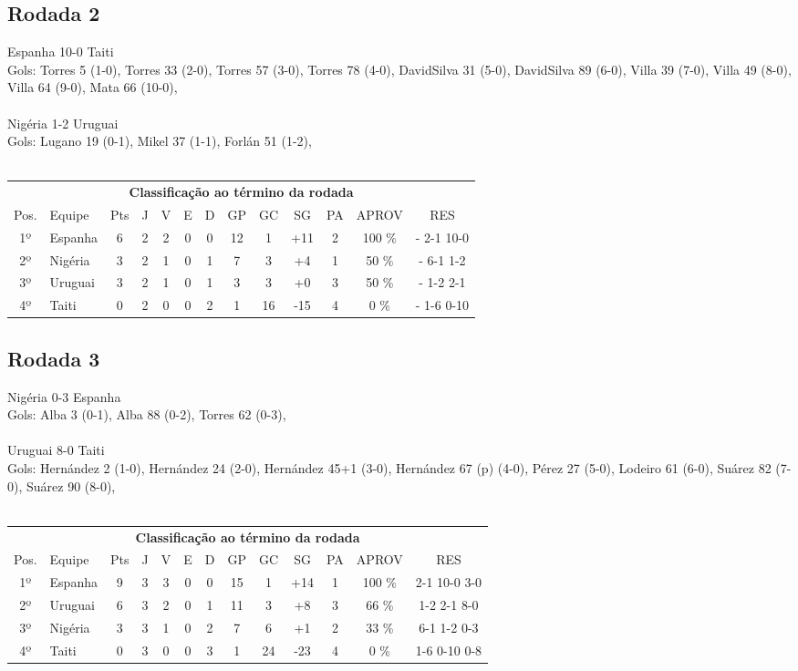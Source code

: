 \documentclass{article}
\begin{document}
\subsection*{Rodada 2}
Espanha 10-0 Taiti\\
Gols: Torres 5 (1-0), Torres 33 (2-0), Torres 57 (3-0), Torres 78 (4-0), DavidSilva 31 (5-0), DavidSilva 89 (6-0), Villa 39 (7-0), Villa 49 (8-0), Villa 64 (9-0), Mata 66 (10-0), \\
\\
Nigéria 1-2 Uruguai\\
Gols: Lugano 19 (0-1), Mikel 37 (1-1), Forlán 51 (1-2), \\
\\
\begin{center}
\begin{tabular}{| c | l | c | c | c | c | c | c | c | c | c | c | c |}
\multicolumn{13}{c}{\textbf{Classificação ao término da rodada}}\\
Pos.&Equipe&Pts&J&V&E&D&GP&GC&SG&PA&APROV&RES\\
1º&Espanha             &6&2	&2&0&0	&12&1&+11	&2&100 \%	& - 2-1 10-0 \\
2º&Nigéria             &3&2	&1&0&1	&7&3&+4	&1& 50 \%	& - 6-1 1-2 \\
3º&Uruguai             &3&2	&1&0&1	&3&3&+0	&3& 50 \%	& - 1-2 2-1 \\
4º&Taiti               &0&2	&0&0&2	&1&16&-15	&4&  0 \%	& - 1-6 0-10 \\
\end{tabular}
\end{center}


\subsection*{Rodada 3}
Nigéria 0-3 Espanha\\
Gols: Alba 3 (0-1), Alba 88 (0-2), Torres 62 (0-3), \\
\\
Uruguai 8-0 Taiti\\
Gols: Hernández 2 (1-0), Hernández 24 (2-0), Hernández 45+1 (3-0), Hernández 67 (p) (4-0), Pérez 27 (5-0), Lodeiro 61 (6-0), Suárez 82 (7-0), Suárez 90 (8-0), \\
\\
\begin{center}
\begin{tabular}{| c | l | c | c | c | c | c | c | c | c | c | c | c |}
\multicolumn{13}{c}{\textbf{Classificação ao término da rodada}}\\
Pos.&Equipe&Pts&J&V&E&D&GP&GC&SG&PA&APROV&RES\\
1º&Espanha             &9&3	&3&0&0	&15&1&+14	&1&100 \%	&2-1 10-0 3-0 \\
2º&Uruguai             &6&3	&2&0&1	&11&3&+8	&3& 66 \%	&1-2 2-1 8-0 \\
3º&Nigéria             &3&3	&1&0&2	&7&6&+1	&2& 33 \%	&6-1 1-2 0-3 \\
4º&Taiti               &0&3	&0&0&3	&1&24&-23	&4&  0 \%	&1-6 0-10 0-8 \\
\end{tabular}
\end{center}
\end{document}
